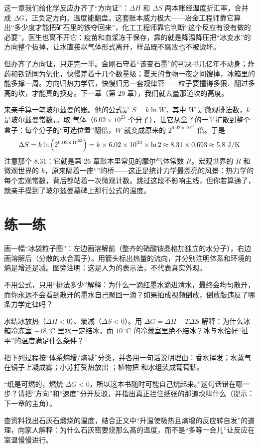 这一章我们给化学反应办齐了“方向证”：$\Delta H$ 和 $\Delta S$ 两本账经温度折汇率，合并成 $\Delta G$，正负定方向，温度能翻盘。这套账本威力极大——冶金工程师靠它算出“多少度才能把矿石里的铁夺回来”，化工工程师靠它判断“这个反应有没有做的必要”，医生也离不开它：疫苗和血浆冻干保存，靠的就是降温降压把“冰变水”的方向整个扳掉，让水直接以气体形式离开，样品既不腐败也不被烫坏。

但办齐了方向证，只走完一半。金刚石守着“该变石墨”的判决书几亿年不动身；炸药和铁锈同为氧化，快慢差着十几个数量级；夏天的食物一夜之间馊掉，冰箱里的能多撑一周。方向归热力学管，快慢归另一套规律管——粒子要撞得多狠、翻过多高的坎，才能真的换身。下一章（第 29 章），我们就去量那道坎的高度。

\begin{tiaozhan}
来亲手算一笔玻尔兹曼的账。他的公式是 $S=k\ln W$，其中 $W$ 是微观排法数，$k$ 是玻尔兹曼常数，。取  气体（$6.02\times10^{23}$ 个分子），让它从盒子的一半扩散到整个盒子：每个分子的“可选位置”翻倍，$W$ 就变成原来的 $2^{6.02\times10^{23}}$ 倍。于是
\[\Delta S = k\ln\left(2^{6.02\times10^{23}}\right) = k\times 6.02\times10^{23}\times\ln 2 \approx 8.31\times 0.693 \approx 5.8\ \mathrm{J/K}\]
注意那个 $8.31$：它就是第 26 章账本里常见的摩尔气体常数 $R$。宏观世界的 $R$ 和微观世界的 $k$，原来隔着一座“”的桥——这正是统计力学最漂亮的风景：热力学的每个宏观常数，背后都站着一次微观计数。跳过这段不影响主线，但你若算通了，就亲手摸到了玻尔兹曼墓碑上那行公式的温度。
\end{tiaozhan}

\section*{练一练}

\begin{sikaoti}
\item 画一幅“冰袋粒子图”：左边画溶解前（整齐的硝酸铵晶格加独立的水分子），右边画溶解后（分散的水合离子）。用箭头标出热量的流向，并分别注明体系和环境的熵是增还是减。图旁注明：这是人为的表示法，不代表真实外观。
\item 不用公式，只用“排法多少”解释：为什么一滴红墨水滴进清水，最终会均匀散开，而你永远不会看到散开的墨水自己聚回一滴？如果拍成视频倒放，倒放版违反了哪条力学定律吗？
\item 水结冰放热（$\Delta H<0$）、熵减（$\Delta S<0$）。用 $\Delta G=\Delta H-T\Delta S$ 解释：为什么冰箱冷冻室 $-18\,^{\circ}\mathrm{C}$ 里水一定结冰，而 $10\,^{\circ}\mathrm{C}$ 的冷藏室里绝不结冰？冰与水恰好“扯平”的温度满足什么条件？
\item 把下列过程按“体系熵增/熵减”分类，并各用一句话说明理由：香水挥发；水蒸气在镜子上凝成雾；小苏打受热放出 ；植物把  和水组装成葡萄糖。
\item “纸是可燃的，燃烧 $\Delta G<0$，所以这本书随时可能自己烧起来。”这句话错在哪一步？请把“方向”和“速度”分开反驳，并指出真正拦住纸张的那道坎叫什么（提示：下一章的主角）。
\item 查资料找出石灰石煅烧的温度，结合正文中“升温使吸热且熵增的反应转自发”的道理，向家人解释：为什么石灰窑要烧那么高的温度，而不是“多等一会儿”让反应在室温慢慢进行。
\end{sikaoti}
